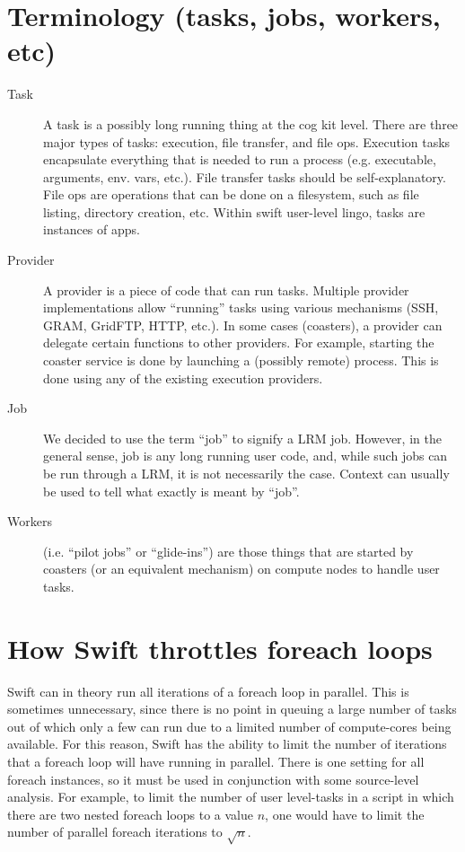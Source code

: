 \documentclass[12pt,letterpaper]{report}
\author{Mihael Hategan}
\begin{document}
\section{Terminology (tasks, jobs, workers, etc)}

\begin{description}
	\item[Task] A task is a possibly long running thing at the cog kit level. There are three major types of tasks: execution, file transfer, and file ops. Execution tasks encapsulate everything that is needed to run a process (e.g. executable, arguments, env. vars, etc.). File transfer tasks should be self-explanatory. File ops are operations that can be done on a filesystem, such as file listing, directory creation, etc. Within swift user-level lingo, tasks are instances of apps.
	
	\item[Provider] A provider is a piece of code that can run tasks. Multiple provider implementations allow ``running'' tasks using various mechanisms (SSH, GRAM, GridFTP, HTTP, etc.). In some cases (coasters), a provider can delegate certain functions to other providers. For example, starting the coaster service is done by launching a (possibly remote) process. This is done using any of the existing execution providers.
	
	\item[Job] We decided to use the term ``job'' to signify a LRM job. However, in the general sense, job is any long running user code, and, while such jobs can be run through a LRM, it is not necessarily the case. Context can usually be used to tell what exactly is meant by ``job''.
	
	\item[Workers] (i.e. ``pilot jobs'' or ``glide-ins'') are those things that are started by coasters (or an equivalent mechanism) on compute nodes to handle user tasks.
\end{description}

\section{How Swift throttles foreach loops}
	Swift can in theory run all iterations of a foreach loop in parallel. This is sometimes unnecessary, since there is no point in queuing a large number of tasks out of which only a few can run due to a limited number of compute-cores being available. For this reason, Swift has the ability to limit the number of iterations that a foreach loop will have running in parallel. There is one setting for all foreach instances, so it must be used in conjunction with some source-level analysis. For example, to limit the number of user level-tasks in a script in which there are two nested foreach loops to a value $n$, one would have to limit the number of parallel foreach iterations to $\sqrt{n}$.
\end{document}

